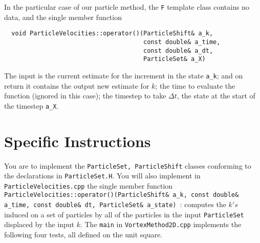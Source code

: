 \documentclass[11pt]{article}
\begin{document}
In the particular case of our particle method, the {\tt F} template class contains no data, and the single member function
\begin{verbatim}
  void ParticleVelocities::operator()(ParticleShift& a_k, 
                                      const double& a_time, 
                                      const double& a_dt,
                                      ParticleSet& a_X)
\end{verbatim}

The input is the current estimate for the increment in the state {\tt a\_k}; and on return it contains the output new estimate for $k$; the time to evaluate the function (ignored in this case); the timestep to take $\Delta t$, the state at the start of the timestep {\tt a\_X}. 

\section*{ Specific Instructions }
You are to implement
the {\tt ParticleSet, ParticleShift} classes conforming to the declarations in {\tt ParticleSet.H}. You will also implement in {\tt ParticleVelocities.cpp} the single member function {\tt ParticleVelocities::operator()(ParticleShift\& a\_k, const double\& a\_time, const double\& dt, ParticleSet\& a\_state) }: computes the $k's$ induced on a set of particles by all of the particles in the input {\tt ParticleSet} displaced by the input $k$.
The {\tt main} in {\tt VortexMethod2D.cpp} implements the following four tests, all defined on the unit square. 
\end{document}

